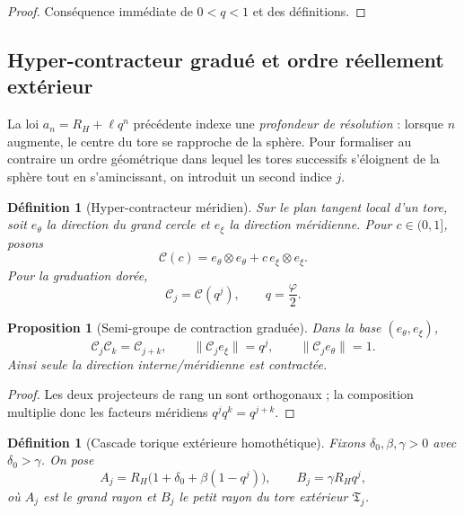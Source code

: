 \documentclass[11pt,a4paper]{article}
\newtheorem{proposition}[theorem]{Proposition}
\newtheorem{definition}[theorem]{Définition}
\newcommand{\ph}{\varphi}
\begin{document}
\begin{proof}
Conséquence immédiate de $0<q<1$ et des définitions.
\end{proof}


\subsection{Hyper-contracteur gradué et ordre réellement extérieur}

La loi $a_n=R_H+\ell q^n$ précédente indexe une \emph{profondeur de résolution} : lorsque $n$ augmente, le centre du tore se rapproche de la sphère. Pour formaliser au contraire un ordre géométrique dans lequel les tores successifs s'éloignent de la sphère tout en s'amincissant, on introduit un second indice $j$.

\begin{definition}[Hyper-contracteur méridien]
Sur le plan tangent local d'un tore, soit $e_\theta$ la direction du grand cercle et $e_\xi$ la direction méridienne. Pour $c\in(0,1]$, posons
\[
 \mathcal C(c)=e_\theta\otimes e_\theta+c\,e_\xi\otimes e_\xi.
\]
Pour la graduation dorée,
\begin{equation}\label{eq:Cj}
 \mathcal C_j=\mathcal C(q^j),\qquad q=\frac\ph2.
\end{equation}
\end{definition}

\begin{proposition}[Semi-groupe de contraction graduée]\label{prop:C-semigroup}
Dans la base $(e_\theta,e_\xi)$,
\[
 \mathcal C_j\mathcal C_k=\mathcal C_{j+k},
 \qquad
 \|\mathcal C_j e_\xi\|=q^j,
 \qquad
 \|\mathcal C_j e_\theta\|=1.
\]
Ainsi seule la direction interne/méridienne est contractée.
\end{proposition}

\begin{proof}
Les deux projecteurs de rang un sont orthogonaux ; la composition multiplie donc les facteurs méridiens $q^jq^k=q^{j+k}$.
\end{proof}

\begin{definition}[Cascade torique extérieure homothétique]\label{def:outer-tori}
Fixons $\delta_0,\beta,\gamma>0$ avec $\delta_0>\gamma$. On pose
\begin{equation}\label{eq:outertorus}
 A_j=R_H\bigl(1+\delta_0+\beta(1-q^j)\bigr),
 \qquad
 B_j=\gamma R_Hq^j,
\end{equation}
où $A_j$ est le grand rayon et $B_j$ le petit rayon du tore extérieur $\mathfrak T_j$.
\end{definition}
\end{document}
